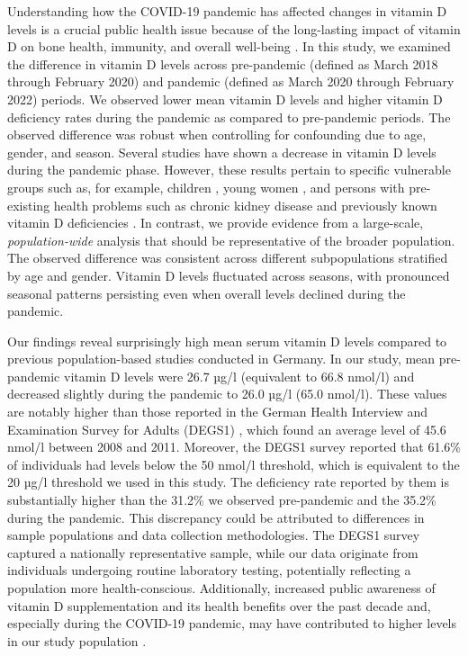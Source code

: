 \documentclass[12pt]{article}
\begin{document}
Understanding how the COVID-19 pandemic has affected changes in vitamin D levels is a crucial public health issue because of the long-lasting impact of vitamin D on bone health, immunity, and overall well-being \cite{Holick2011, Aranow2011}.  In this study, we examined the difference in vitamin D levels across pre-pandemic (defined as March 2018 through February 2020) and pandemic (defined as March 2020 through February 2022) periods. We observed lower mean vitamin D levels and higher vitamin D deficiency rates during the pandemic as compared to pre-pandemic periods. The observed difference was robust when controlling for confounding due to age, gender, and season. Several studies have shown a decrease in vitamin D levels during the pandemic phase. However, these results pertain to specific vulnerable groups such as, for example, children  \cite{Yu2020, Kilic2023, Wong2021}, young women  \cite{Tsugawa2022}, and persons with pre-existing health problems such as chronic kidney disease \cite{ParraOrtega2023} and previously known vitamin D deficiencies  \cite{Katz2021}. In contrast, we provide evidence from a large-scale, \emph{population-wide} analysis that should be representative of the broader population. The observed difference was consistent across different subpopulations stratified by age and gender. Vitamin D levels fluctuated across seasons, with pronounced seasonal patterns persisting even when overall levels declined during the pandemic. 



Our findings reveal surprisingly high mean serum vitamin D levels compared to previous population-based studies conducted in Germany. In our study, mean pre-pandemic vitamin D levels were 26.7 µg/l (equivalent to 66.8 nmol/l) and decreased slightly during the pandemic to 26.0 µg/l (65.0 nmol/l). These values are notably higher than those reported in the German Health Interview and Examination Survey for Adults (DEGS1) \cite{Rabenberg2015}, which found an average level of 45.6 nmol/l between 2008 and 2011. Moreover, the DEGS1 survey reported that 61.6\% of individuals had levels below the 50 nmol/l threshold, which is equivalent to the 20 µg/l threshold we used in this study. The deficiency rate reported by them is substantially higher than the 31.2\% we observed pre-pandemic and the 35.2\% during the pandemic. This discrepancy could be attributed to differences in sample populations and data collection methodologies. The DEGS1 survey captured a nationally representative sample, while our data originate from individuals undergoing routine laboratory testing, potentially reflecting a population more health-conscious.  Additionally, increased public awareness of vitamin D supplementation and its health benefits over the past decade and, especially during the COVID-19 pandemic, may have contributed to higher levels in our study population \cite{Smaha2023}.
\end{document}
